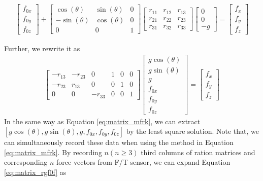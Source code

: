 \begin{equation}
\begin{split}
\begin{bmatrix}
f_{0x}\\
f_{0y}\\
f_{0z}
\end{bmatrix}
+
\begin{bmatrix}
\cos(\theta)	&\sin(\theta)	&0 \\
-\sin(\theta)	&\cos(\theta)	&0 \\
0				&0				&1
\end{bmatrix}
\begin{bmatrix}
r_{11}		&r_{12}		&r_{13} \\
r_{21}		&r_{22}		&r_{23} \\
r_{31}		&r_{32}		&r_{33}
\end{bmatrix}
\begin{bmatrix}
0\\
0\\
-g
\end{bmatrix}
=
\begin{bmatrix}
f_x\\
f_y\\
f_z
\end{bmatrix}
\end{split}
\end{equation}
\par
Further, we rewrite it as 
\begin{equation}
\label{eq:matrix_rgf0f}
\begin{split}
\begin{bmatrix}
-r_{13}		&-r_{23} 	&0			&1		&0		&0\\
-r_{23}		&r_{13}		&0			&0		&1		&0\\
0			&0			&-r_{33}	&0		&0		&1
\end{bmatrix}
\begin{bmatrix}
g\cos(\theta)\\
g\sin(\theta)\\
g\\
f_{0x}\\
f_{0y}\\
f_{0z}
\end{bmatrix}
=
\begin{bmatrix}
f_x\\
f_y\\
f_z
\end{bmatrix}
\end{split}
\end{equation}
In the same way as Equation \ref{eq:matrix_mfrk}, we can extract $[g\cos(\theta),g\sin(\theta),g,f_{0x},f_{0y},f_{0z}]$ by the least square solution. Note that, we can simultaneously record these data when using the method in Equation \ref{eq:matrix_mfrk}. By recording $n(n\geq3)$ third columns of ration matrices and corresponding $n$ force vectors from F/T sensor, we can expand Equation \ref{eq:matrix_rgf0f} as
